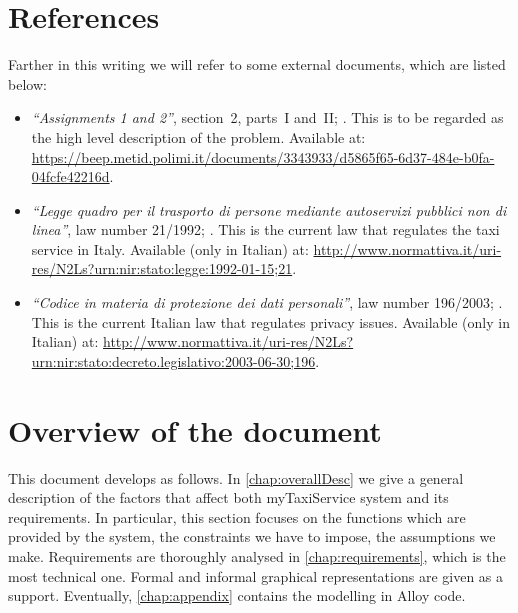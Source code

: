 \section{References}\label{sec:references}	
Farther in this writing we will refer to some external documents, which are listed below:
\begin{itemize}
	\item \emph{``Assignments 1 and 2''}, section~2, parts~I and~II; . This is to be regarded as the high level description of the problem. Available at: \url{https://beep.metid.polimi.it/documents/3343933/d5865f65-6d37-484e-b0fa-04fcfe42216d}.
	\item \emph{``Legge quadro per il trasporto di persone mediante autoservizi pubblici non di linea''}, law number 21/1992; . This is the current law that regulates the taxi service in Italy. Available (only in Italian) at: \url{http://www.normattiva.it/uri-res/N2Ls?urn:nir:stato:legge:1992-01-15;21}.
	\item \emph{``Codice in materia di protezione dei dati personali''}, law number 196/2003; . This is the current Italian law that regulates privacy issues. Available (only in Italian) at: \url{http://www.normattiva.it/uri-res/N2Ls?urn:nir:stato:decreto.legislativo:2003-06-30;196}.
\end{itemize}


\section{Overview of the document}	
This document develops as follows. In \cref{chap:overallDesc} we give a general description of the factors that affect both myTaxiService system and its requirements. In particular, this section focuses on the functions which are provided by the system, the constraints we have to impose, the assumptions we make. Requirements are thoroughly analysed in \cref{chap:requirements}, which is the most technical one. Formal and informal graphical representations are given as a support. Eventually, \cref{chap:appendix} contains the modelling in Alloy code.


